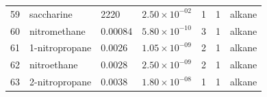\begin{longtable}{r l l l c c l}
59 & {saccharine}               & 2220    & $2.50 \times 10^{-02} $ & 1 & 1 & alkane \\
60 & {nitromethane}             & 0.00084 & $5.80 \times 10^{-10} $ & 3 & 1 & alkane \\
61 & {1-nitropropane}           & 0.0026  & $1.05 \times 10^{-09} $ & 2 & 1 & alkane \\
62 & {nitroethane}              & 0.0028  & $2.50 \times 10^{-09} $ & 2 & 1 & alkane \\
63 & {2-nitropropane}           & 0.0038  & $1.80 \times 10^{-08} $ & 1 & 1 & alkane \\
\end{longtable} 
